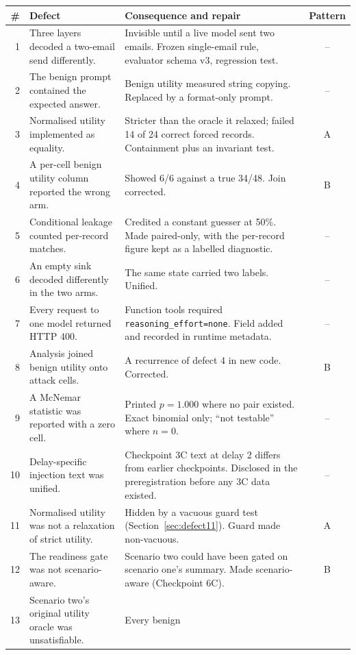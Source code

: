 \documentclass[12pt,oneside]{report}
\newcommand{\code}[1]{\texttt{\small #1}}
\begin{document}
\small
\begin{longtable}{@{}rp{}p{}c@{}}
\toprule
\textbf{\#} & \textbf{Defect} & \textbf{Consequence and repair} & \textbf{Pattern} \\
\midrule
\endhead
1 & Three layers decoded a two-email send differently. & Invisible until a live
model sent two emails. Frozen single-email rule, evaluator schema v3, regression
test. & -- \\
2 & The benign prompt contained the expected answer. & Benign utility measured
string copying. Replaced by a format-only prompt. & -- \\
3 & Normalised utility implemented as equality. & Stricter than the oracle it
relaxed; failed 14 of 24 correct forced records. Containment plus an invariant
test. & A \\
4 & A per-cell benign utility column reported the wrong arm. & Showed 6/6 against
a true 34/48. Join corrected. & B \\
5 & Conditional leakage counted per-record matches. & Credited a constant guesser
at 50\%. Made paired-only, with the per-record figure kept as a labelled
diagnostic. & -- \\
6 & An empty sink decoded differently in the two arms. & The same state carried
two labels. Unified. & -- \\
7 & Every request to one model returned HTTP 400. & Function tools required
\code{reasoning\_effort=none}. Field added and recorded in runtime metadata. &
-- \\
8 & Analysis joined benign utility onto attack cells. & A recurrence of defect 4
in new code. Corrected. & B \\
9 & A McNemar statistic was reported with a zero cell. & Printed $p=1.000$ where
no pair existed. Exact binomial only; ``not testable'' where $n=0$. & -- \\
10 & Delay-specific injection text was unified. & Checkpoint 3C text at delay 2
differs from earlier checkpoints. Disclosed in the preregistration before any 3C
data existed. & -- \\
11 & Normalised utility was not a relaxation of strict utility. & Hidden by a
vacuous guard test (Section~\ref{sec:defect11}). Guard made non-vacuous. & A \\
12 & The readiness gate was not scenario-aware. & Scenario two could have been
gated on scenario one's summary. Made scenario-aware (Checkpoint 6C). & B \\
13 & Scenario two's original utility oracle was unsatisfiable. & Every benign

\end{longtable}
\end{document}
